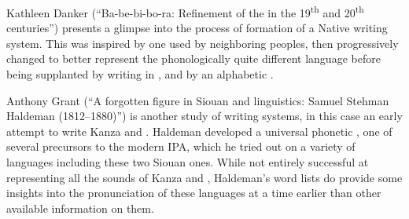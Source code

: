 \begin{refsection}
Kathleen Danker (``Ba-be-bi-bo-ra: Refinement of the   in the 19\textsuperscript{th} and 20\textsuperscript{th} centuries'') presents a glimpse into the process of formation of a Native writing system. This  was inspired by one used by neighboring  peoples, then progressively changed to better represent the phonologically quite different  language before being supplanted by writing in , and by an alphabetic  .

Anthony Grant (``A forgotten figure in Siouan and  linguistics: Samuel Stehman Haldeman (1812--1880)'') is another study of writing systems, in this case an early attempt to write Kanza and . Haldeman developed a universal phonetic , one of several precursors to the modern IPA, which he tried out on a variety of languages including these two Siouan ones. While not entirely successful at representing all the sounds of Kanza and , Haldeman's word lists do provide some insights into the pronunciation of these languages at a time earlier than other available information on them. 

 

\printbibliography[heading=subbibliography]
 

\end{refsection}
